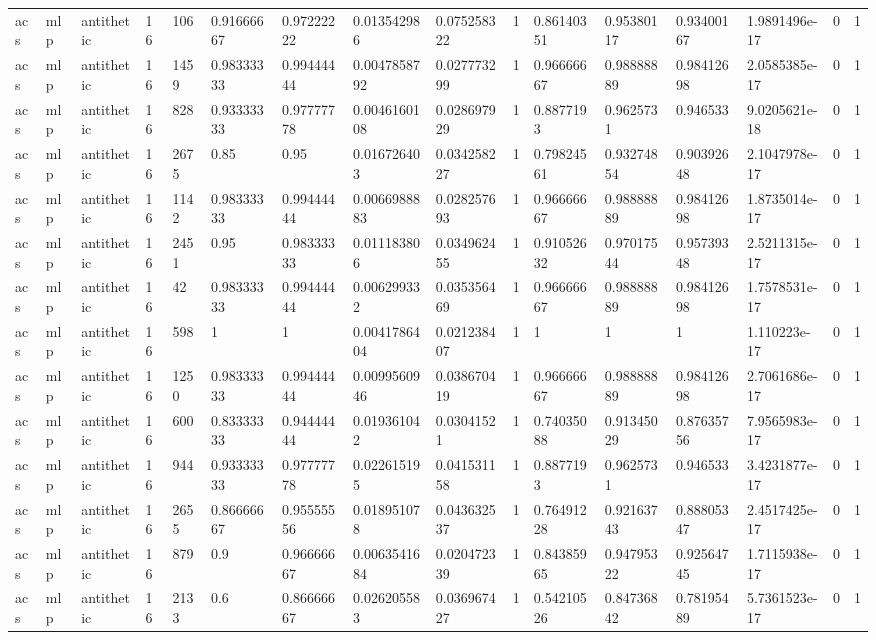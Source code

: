 \begin{tabular}{llllllllllllllll}
acs & mlp & antithetic & 16 & 106 & 0.91666667 & 0.97222222 & 0.013542986 & 0.075258322 & 1 & 0.86140351 & 0.95380117 & 0.93400167 & 1.9891496e-17 & 0 & 1 \\
acs & mlp & antithetic & 16 & 1459 & 0.98333333 & 0.99444444 & 0.0047858792 & 0.027773299 & 1 & 0.96666667 & 0.98888889 & 0.98412698 & 2.0585385e-17 & 0 & 1 \\
acs & mlp & antithetic & 16 & 828 & 0.93333333 & 0.97777778 & 0.0046160108 & 0.028697929 & 1 & 0.8877193 & 0.9625731 & 0.946533 & 9.0205621e-18 & 0 & 1 \\
acs & mlp & antithetic & 16 & 2675 & 0.85 & 0.95 & 0.016726403 & 0.034258227 & 1 & 0.79824561 & 0.93274854 & 0.90392648 & 2.1047978e-17 & 0 & 1 \\
acs & mlp & antithetic & 16 & 1142 & 0.98333333 & 0.99444444 & 0.0066988883 & 0.028257693 & 1 & 0.96666667 & 0.98888889 & 0.98412698 & 1.8735014e-17 & 0 & 1 \\
acs & mlp & antithetic & 16 & 2451 & 0.95 & 0.98333333 & 0.011183806 & 0.034962455 & 1 & 0.91052632 & 0.97017544 & 0.95739348 & 2.5211315e-17 & 0 & 1 \\
acs & mlp & antithetic & 16 & 42 & 0.98333333 & 0.99444444 & 0.006299332 & 0.035356469 & 1 & 0.96666667 & 0.98888889 & 0.98412698 & 1.7578531e-17 & 0 & 1 \\
acs & mlp & antithetic & 16 & 598 & 1 & 1 & 0.0041786404 & 0.021238407 & 1 & 1 & 1 & 1 & 1.110223e-17 & 0 & 1 \\
acs & mlp & antithetic & 16 & 1250 & 0.98333333 & 0.99444444 & 0.0099560946 & 0.038670419 & 1 & 0.96666667 & 0.98888889 & 0.98412698 & 2.7061686e-17 & 0 & 1 \\
acs & mlp & antithetic & 16 & 600 & 0.83333333 & 0.94444444 & 0.019361042 & 0.03041521 & 1 & 0.74035088 & 0.91345029 & 0.87635756 & 7.9565983e-17 & 0 & 1 \\
acs & mlp & antithetic & 16 & 944 & 0.93333333 & 0.97777778 & 0.022615195 & 0.041531158 & 1 & 0.8877193 & 0.9625731 & 0.946533 & 3.4231877e-17 & 0 & 1 \\
acs & mlp & antithetic & 16 & 2655 & 0.86666667 & 0.95555556 & 0.018951078 & 0.043632537 & 1 & 0.76491228 & 0.92163743 & 0.88805347 & 2.4517425e-17 & 0 & 1 \\
acs & mlp & antithetic & 16 & 879 & 0.9 & 0.96666667 & 0.0063541684 & 0.020472339 & 1 & 0.84385965 & 0.94795322 & 0.92564745 & 1.7115938e-17 & 0 & 1 \\
acs & mlp & antithetic & 16 & 2133 & 0.6 & 0.86666667 & 0.026205583 & 0.036967427 & 1 & 0.54210526 & 0.84736842 & 0.78195489 & 5.7361523e-17 & 0 & 1 \\

\end{tabular}
